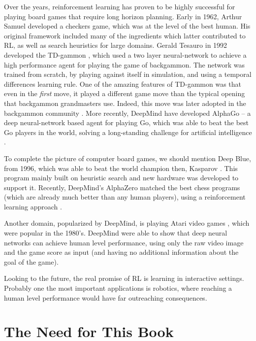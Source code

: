 Over the years, reinforcement learning has proven to be highly
successful for playing board games that require long horizon planning. 
Early in 1962, Arthur Samuel \cite{Samuel62} developed a checkers game, which was at
the level of the best human. His original framework included many of
the ingredients which latter contributed to RL,
as well as search heuristics for large domains.
Gerald
Tesauro in 1992 developed the TD-gammon \cite{Tesauro95}, which used a two layer
neural-network to achieve a high performance agent for playing the game of backgammon. The network was trained from scratch, by playing against itself in simulation, and using a temporal differences learning rule. One of the amazing features
of TD-gammon was that even in the {\em first} move, it played a
different game move than the typical opening that backgammon grandmasters use. Indeed, this move was later adopted in the backgammon community \cite{Tesauro02}.
More recently, DeepMind have developed AlphaGo -- a deep neural-network based agent
for playing Go, which was able to beat the best Go players in the world, solving a long-standing challenge for artificial intelligence \cite{SilverHMGSDSAPL16}. 

To complete the picture of computer board games, we should mention
Deep Blue, from 1996, which was able to beat the world champion then,
Kasparov \cite{DeepBlue}. This program mainly built on heuristic search and new hardware was developed to support it. Recently, DeepMind's
AlphaZero matched the best chess
programs (which are already much better than any human players), using a reinforcement learning approach \cite{silver2017mastering}.

Another domain, popularized by DeepMind, is playing Atari video
games \cite{mnih2015human}, which were popular in the 1980's. DeepMind were able to
show that deep neural networks can achieve human level performance,
using only the raw video image and the game score as input (and having no additional
information about the goal of the game). 

Looking to the future, the real promise of RL
is learning in interactive settings. Probably one the most important
applications is robotics, where reaching a human level performance
would have far outreaching consequences. 

\section{The Need for This Book}

